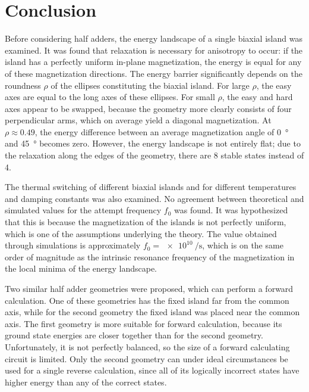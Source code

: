 \documentclass[twocolumn]{phdsymp}
\begin{document}
\section{Conclusion}
Before considering half adders, the energy landscape of a single biaxial island was examined. It was found that relaxation is necessary for anisotropy to occur: if the island has a perfectly uniform in-plane magnetization, the energy is equal for any of these magnetization directions. The energy barrier significantly depends on the roundness $\rho$ of the ellipses constituting the biaxial island. For large $\rho$, the easy axes are equal to the long axes of these ellipses. For small $\rho$, the easy and hard axes appear to be swapped, because the geometry more clearly consists of four perpendicular arms, which on average yield a diagonal magnetization. At $\rho \approx 0.49$, the energy difference between an average magnetization angle of \SI{0}{\degree} and \SI{45}{\degree} becomes zero. However, the energy landscape is not entirely flat; due to the relaxation along the edges of the geometry, there are 8 stable states instead of 4. \par
The thermal switching of different biaxial islands and for different temperatures and damping constants was also examined. No agreement between theoretical and simulated values for the attempt frequency $f_0$ was found. It was hypothesized that this is because the magnetization of the islands is not perfectly uniform, which is one of the assumptions underlying the theory. The value obtained through simulations is approximately $f_0=\SI{e10}{\per\second}$, which is on the same order of magnitude as the intrinsic resonance frequency of the magnetization in the local minima of the energy landscape. \par
Two similar half adder geometries were proposed, which can perform a forward calculation. One of these geometries has the fixed island far from the common axis, while for the second geometry the fixed island was placed near the common axis. The first geometry is more suitable for forward calculation, because its ground state energies are closer together than for the second geometry. Unfortunately, it is not perfectly balanced, so the size of a forward calculating circuit is limited. Only the second geometry can under ideal circumstances be used for a single reverse calculation, since all of its logically incorrect states have higher energy than any of the correct states.


\nocite{*}


\end{document}
